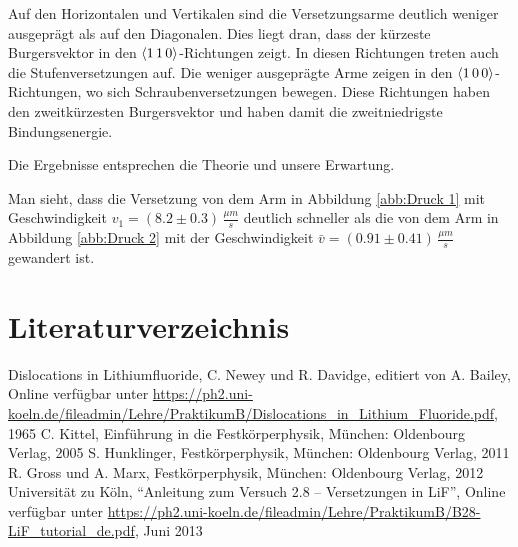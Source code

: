 \documentclass[12pt,a4paper]{scrartcl}
\numberwithin{equation}{section} %
\begin{document}
Auf den Horizontalen und Vertikalen sind die Versetzungsarme deutlich
weniger ausgeprägt als auf den Diagonalen. Dies liegt dran, dass der
kürzeste Burgersvektor in den $\expval{1\,1\,0}$-Richtungen zeigt. In
diesen Richtungen treten auch die Stufenversetzungen auf. Die weniger
ausgeprägte Arme zeigen in den $\expval{1\,0\,0}$-Richtungen, wo sich
Schraubenversetzungen bewegen. Diese Richtungen haben den zweitkürzesten
Burgersvektor und haben damit die zweitniedrigste Bindungsenergie.

Die Ergebnisse entsprechen die Theorie und unsere Erwartung.

Man sieht, dass die Versetzung von dem Arm in Abbildung \ref{abb:Druck 1} mit
Geschwindigkeit $v_1=(8.2 \pm 0.3) \,\frac{\mu m}{s}$ deutlich
schneller als die von dem Arm in Abbildung \ref{abb:Druck 2} mit der
Geschwindigkeit $\bar{v}=(0.91 \pm 0.41) \,\frac{\mu m}{s}$ gewandert
ist.

\clearpage
\hypertarget{literaturverzeichnis}{%
	\section{Literaturverzeichnis}\label{literaturverzeichnis}}
\begin{thebibliography}{9}
	Dislocations in Lithiumfluoride, C. Newey und R. Davidge, editiert von
	A. Bailey, Online verfügbar unter
	\url{https://ph2.uni-koeln.de/fileadmin/Lehre/PraktikumB/Dislocations_in_Lithium_Fluoride.pdf},
	1965
	C. Kittel, Einführung in die Festkörperphysik, München: Oldenbourg Verlag, 2005
	S. Hunklinger, Festkörperphysik, München: Oldenbourg Verlag, 2011
	R. Gross und A. Marx, Festkörperphysik, München: Oldenbourg Verlag, 2012
	Universität zu Köln, ``Anleitung zum Versuch 2.8 -- Versetzungen in
	LiF'', Online verfügbar unter
	\url{https://ph2.uni-koeln.de/fileadmin/Lehre/PraktikumB/B28-LiF_tutorial_de.pdf},
	Juni 2013
\end{thebibliography}
\end{document}
